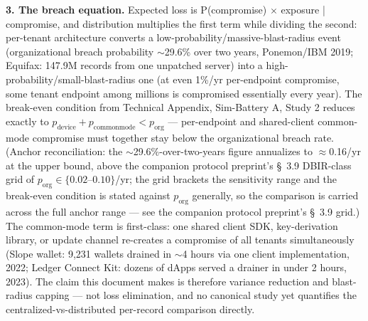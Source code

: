 \documentclass[11pt,twocolumn]{article}
\begin{document}
\textbf{3. The breach equation.} Expected loss is P(compromise) $\times$ exposure | compromise, and distribution multiplies the first term while dividing the second: per-tenant architecture converts a low-probability/massive-blast-radius event (organizational breach probability $\sim$29.6\% over two years, Ponemon/IBM 2019; Equifax: 147.9M records from one unpatched server) into a high-probability/small-blast-radius one (at even 1\%/yr per-endpoint compromise, some tenant endpoint among millions is compromised essentially every year). The break-even condition from Technical Appendix, Sim-Battery A, Study 2 reduces exactly to \textbf{$p_{\mathrm{device}} + p_{\mathrm{commonmode}} < p_{\mathrm{org}}$} --- per-endpoint and shared-client common-mode compromise must together stay below the organizational breach rate. (Anchor reconciliation: the $\sim$29.6\%-over-two-years figure annualizes to $\approx$0.16/yr at the upper bound, above the companion protocol preprint's \S~3.9 DBIR-class grid of $p_{\mathrm{org}} \in \{0.02\text{--}0.10\}$/yr; the grid brackets the sensitivity range and the break-even condition is stated against $p_{\mathrm{org}}$ generally, so the comparison is carried across the full anchor range --- see the companion protocol preprint's \S~3.9 grid.) The common-mode term is first-class: one shared client SDK, key-derivation library, or update channel re-creates a compromise of all tenants simultaneously (Slope wallet: 9,231 wallets drained in $\sim$4 hours via one client implementation, 2022; Ledger Connect Kit: dozens of dApps served a drainer in under 2 hours, 2023). The claim this document makes is therefore variance reduction and blast-radius capping --- not loss elimination, and no canonical study yet quantifies the centralized-vs-distributed per-record comparison directly.
\end{document}
